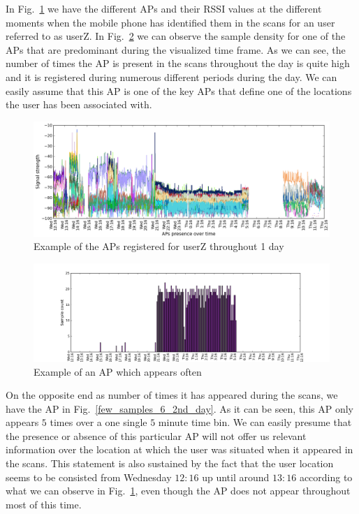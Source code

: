 In Fig.~\ref{rssi_6_2nd_day} we have the different APs and their RSSI values at
the different moments when the mobile phone has identified them in the scans for
an user referred to as userZ. In Fig.~\ref{samples_6_2nd_day} we can observe the
sample density for one of the APs that are predominant during the visualized
time frame. As we can see, the number of times the AP is present in the scans
throughout the day is quite high and it is registered during numerous different
periods during the day. We can easily assume that this AP is one of the key APs
that define one of the locations the user has been associated with.

\begin{figure}[h]
\centering
\includegraphics[width =\textwidth]{figures/combinations/user_6_sorted_1days_plot_croped.png}
\caption{Example of the APs registered for userZ throughout 1 day}
\label{rssi_6_2nd_day}
\end{figure}

\begin{figure}[h]
\centering
\includegraphics[width =\textwidth]{figures/combinations/user_6_sorted_1days_plot_14280_histo.png}
\caption{Example of an AP which appears often}
\label{samples_6_2nd_day}
\end{figure}

On the opposite end as number of times it has appeared during the scans, we have
the AP in Fig.~\ref{few_samples_6_2nd_day}. As it can be seen, this AP only
appears $5$ times over a one single $5$ minute time bin. We can easily presume
that the presence or absence of this particular AP will not offer us relevant
information over the location at which the user was situated when it appeared in
the scans. This statement is also sustained by the fact that the user location
seems to be consisted from Wednesday $12:16$ up until around $13:16$ according
to what we can observe in Fig.~\ref{rssi_6_2nd_day}, even though the AP does not appear
throughout most of this time.

